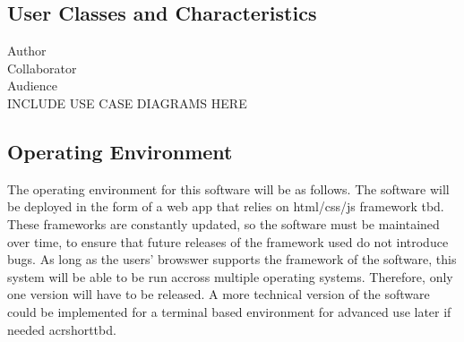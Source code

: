 \documentclass{article}
\newcommand{\comment}[1]{}
\begin{document}
\subsection{User Classes and Characteristics}
\comment{
Identify the various user classes that you anticipate will use this product. User classes may be differentiated based on the frequency of use, subset of product functions used, technical expertise, security or privelege levels, educational level, or experience. Describe the pertinent characteristics of each user class. Certain requirements may pertain only to certain user classes. Distinguish the most import user classes for this product from those who are less important to satisfy.
}
Author \\
Collaborator \\  
Audience \\ 

INCLUDE USE CASE DIAGRAMS HERE
\subsection{Operating Environment}
\comment{
Describe the enviroment in which the software will operate, including the hardware platform, operating systems and versions, and any other software components or applications with which it must peacefully coexist.
	}
The operating environment for this software will be as follows. The software will be deployed in the form of a web app that relies on html/css/js framework \acrfull{tbd}. These frameworks are constantly updated, so the software must be maintained over time, to ensure that future releases of the framework used do not introduce bugs. As long as the users' browswer supports the framework of the software, this system will be able to be run accross multiple operating systems. Therefore, only one version will have to be released. A more technical version of the software could be implemented for a terminal based environment for advanced use later if needed acrshort{tbd}. 
\end{document}
